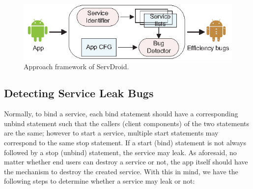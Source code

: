 \documentclass[sigconf,review, anonymous]{acmart}
\begin{document}
 \begin{figure}
 \centering
  \includegraphics[scale=1.1]{framework.eps}
 \caption{Approach framework of \textsf{ServDroid}.}
\label{fig_framework}
\end{figure}

\subsection{Detecting Service Leak Bugs}
Normally, to bind a service, each bind statement should have a corresponding
unbind statement such that the callers (client components) of the two statements
are the same; however to start a service, multiple start statements may
correspond to the same stop statement. If a start (bind) statement is not always
followed by a stop (unbind) statement, the service may leak. As aforesaid, no
matter whether end users can destroy a service or not, the app itself should
have the mechanism to destroy the created service.  With this in mind, we have
the following steps to determine whether a service may leak or not:
\end{document}
